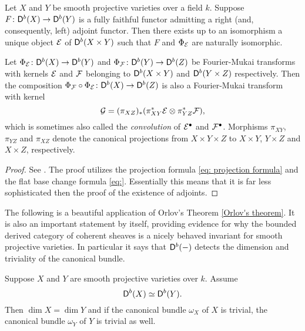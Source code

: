 \begin{theorem}
    \label{Orlov's theorem}
    Let $X$ and $Y$ be smooth projective varieties over a field $k$. Suppose $F \colon \mathsf{D}^b(X) \to \mathsf{D}^b(Y)$ is a fully faithful functor admitting a right (and, consequently, left) adjoint functor. Then there exists up to an isomorphism a unique object $\mathcal E$ of $\mathsf{D}^b(X \times Y)$ such that $F$ and $\Phi_{\mathcal E}$ are naturally isomorphic.
\end{theorem}

\begin{proposition}
    \label{Composition of fm is fm}
    Let $\Phi_{\mathcal E} \colon \mathsf{D}^b(X) \to \mathsf{D}^b(Y)$ and $\Phi_{\mathcal F} \colon \mathsf{D}^b(Y) \to \mathsf{D}^b(Z)$ be Fourier-Mukai transforms with kernels $\mathcal E$ and $\mathcal F$ belonging to $\mathsf{D}^b(X \times Y)$ and $\mathsf{D}^b(Y \times Z)$ respectively. Then the composition $\Phi_{\mathcal F} \circ \Phi_{\mathcal E} \colon \mathsf{D}^b(X) \to \mathsf{D}^b(Z)$ is also a Fourier-Mukai transform with kernel
    \[
        \mathcal G = (\pi_{XZ})_*(\pi_{XY}^*\mathcal E \otimes \pi_{YZ}^*\mathcal F),
    \]
    which is sometimes also called the \emph{convolution} of $\mathcal E^\bullet$ and $\mathcal F^\bullet$. Morphisms $\pi_{XY}$, $\pi_{YZ}$ and $\pi_{XZ}$ denote the canonical projections from $X \times Y \times Z$ to $X \times Y$, $Y \times Z$ and $X \times Z$, respectively.
\end{proposition}

\begin{proof}
    See \cite[\S 5, 5.10]{huybrechts2006fouriermukai}. The proof utilizes the projection formula \eqref{eq: projection formula} and the flat base change formula \eqref{eq:}. Essentially this means that it is far less sophisticated then the proof of the existence of adjoints.    
\end{proof}

The following is a beautiful application of Orlov's Theorem \ref{Orlov's theorem}. It is also an important statement by itself, providing evidence for why the bounded derived category of coherent sheaves is a nicely behaved invariant for smooth projective varieties. In particular it says that $\mathsf{D}^b(-)$ detects the dimension and triviality of the canonical bundle.  
\begin{theorem}
    \label{Db detects dimension and triviality of canonical bundle}
    Suppose $X$ and $Y$ are smooth projective varieties over $k$. Assume
    \[
        \mathsf{D}^b(X) \simeq \mathsf{D}^b(Y).
    \]
    Then $\dim X = \dim Y$ and if the canonical bundle $\omega_X$ of $X$ is trivial, the canonical bundle $\omega_Y$ of $Y$ is trivial as well.
\end{theorem}

